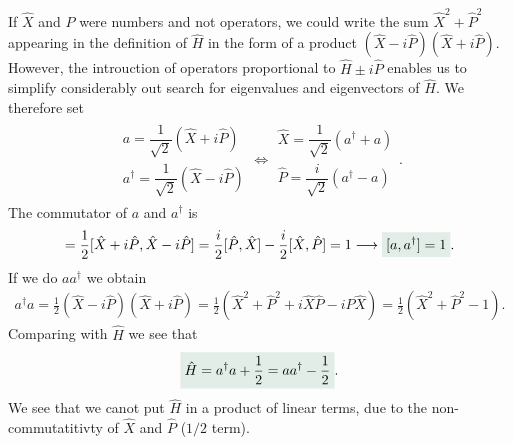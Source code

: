 If $\hat{X}$ and $\hat{P}$ were numbers and not operators, we could write the sum $\hat{X}^2+\hat{P}^2$ appearing in the definition of $\hat{H}$ in the form of a product 
$(\hat{X}-i\hat{P})(\hat{X}+i\hat{P})$. However, the introuction of operators proportional to $\hat{H}\pm i\hat{P}$ enables us to simplify considerably out search for eigenvalues 
and eigenvectors of $\hat{H}$.
We therefore set 
\begin{align}
    \begin{array}{l}
        a=\dfrac{1}{\sqrt{2}}(\hat{X}+i\hat{P})\\
        a^\dagger=\dfrac{1}{\sqrt{2}}(\hat{X}-i\hat{P})
    \end{array}\Longleftrightarrow
    \begin{array}{l}
        \hat{X}=\dfrac{1}{\sqrt{2}}(a^\dagger+a)\\
        \hat{P}=\dfrac{i}{\sqrt{2}}(a^\dagger-a)
    \end{array}.
\end{align}
The commutator of $a$ and $a^\dagger$ is 
\begin{align}
    [a,a^\dagger]=\frac{1}{2}[\hat{X}+i\hat{P},\hat{X}-i\hat{P}]=\frac{i}{2}[\hat{P},\hat{X}]-\frac{i}{2}[\hat{X},\hat{P}]=1\longrightarrow\highlight{[a,a^\dagger]=1}.
\end{align}
If we do $aa^\dagger$ we obtain
\begin{align*}
    a^\dagger a=\frac{1}{2}(\hat{X}-i\hat{P})(\hat{X}+i\hat{P})=\frac{1}{2}(\hat{X}^2+\hat{P}^2+i\hat{X}\hat{P}-i\hat{P}\hat{X})=\frac{1}{2}(\hat{X}^2+\hat{P}^2-1).
\end{align*}
Comparing with $\hat{H}$ we see that 
\begin{align*}
    \highlight{\hat{H}=a^\dagger a+\frac{1}{2}=aa^\dagger-\frac{1}{2}}.
\end{align*}
We see that we canot put $\hat{H}$ in a product of linear terms, due to the non-commutatitivty of $\hat{X}$ and $\hat{P}$ ($1/2$ term).

